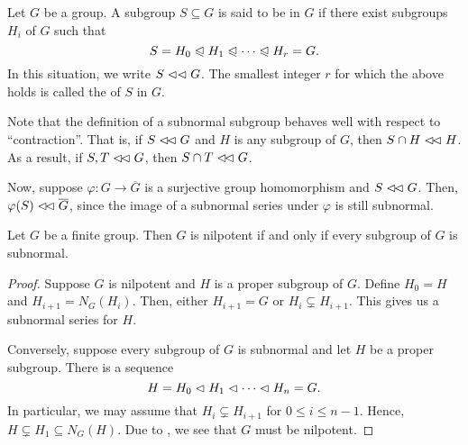 \begin{definition}
    Let $G$ be a group. A subgroup $S\subseteq G$ is said to be  in $G$ if there exist subgroups $H_i$ of $G$ such that 
    \begin{equation*}
        S = H_0\trianglelefteqslant H_1\trianglelefteqslant\cdots\trianglelefteqslant H_r = G.
    \end{equation*}
    In this situation, we write $S\vartriangleleft\vartriangleleft G$. The smallest integer $r$ for which the above holds is called the  of $S$ in $G$.
\end{definition}

\begin{remark}
    Note that the definition of a subnormal subgroup behaves well with respect to ``contraction''. That is, if $S\vartriangleleft\!\vartriangleleft G$ and $H$ is any subgroup of $G$, then $S\cap H\vartriangleleft\!\vartriangleleft H$. As a result, if $S, T\vartriangleleft\!\vartriangleleft G$, then $S\cap T\vartriangleleft\!\vartriangleleft G$.

    Now, suppose $\varphi: G\to\overline G$ is a surjective group homomorphism and $S\vartriangleleft\!\vartriangleleft G$. Then, $\varphi(S)\vartriangleleft\!\vartriangleleft\overline G$, since the image of a subnormal series under $\varphi$ is still subnormal.
\end{remark}

\begin{lemma}
    Let $G$ be a finite group. Then $G$ is nilpotent if and only if every subgroup of $G$ is subnormal.
\end{lemma}
\begin{proof}
    Suppose $G$ is nilpotent and $H$ is a proper subgroup of $G$. Define $H_0 = H$ and $H_{i + 1} = N_G(H_i)$. Then, either $H_{i + 1} = G$ or $H_i\subsetneq H_{i + 1}$. This gives us a subnormal series for $H$.

    Conversely, suppose every subgroup of $G$ is subnormal and let $H$ be a proper subgroup. There is a sequence 
    \begin{equation*}
        H = H_0\vartriangleleft H_1\vartriangleleft\cdots\vartriangleleft H_n = G.
    \end{equation*}
    In particular, we may assume that $H_i\subsetneq H_{i + 1}$ for $0\le i\le n - 1$. Hence, $H\subsetneq H_1\subseteq N_G(H)$. Due to , we see that $G$ must be nilpotent.
\end{proof}

